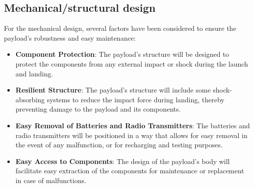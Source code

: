 \subsection{Mechanical/structural design}

For the mechanical design, several factors have been considered to ensure the payload's robustness and easy maintenance:

\begin{itemize}
    \item \textbf{Component Protection}: The payload's structure will be designed to protect the components from any external impact or shock during the launch and landing.
    \item \textbf{Resilient Structure}: The payload's structure will include some shock-absorbing systems to reduce the impact force during landing, thereby preventing damage to the payload and its components.
    \item \textbf{Easy Removal of Batteries and Radio Transmitters}: The batteries and radio transmitters will be positioned in a way that allows for easy removal in the event of any malfunction, or for recharging and testing purposes.
    \item \textbf{Easy Access to Components}: The design of the payload's body will facilitate easy extraction of the components for maintenance or replacement in case of malfunctions.
\end{itemize}

